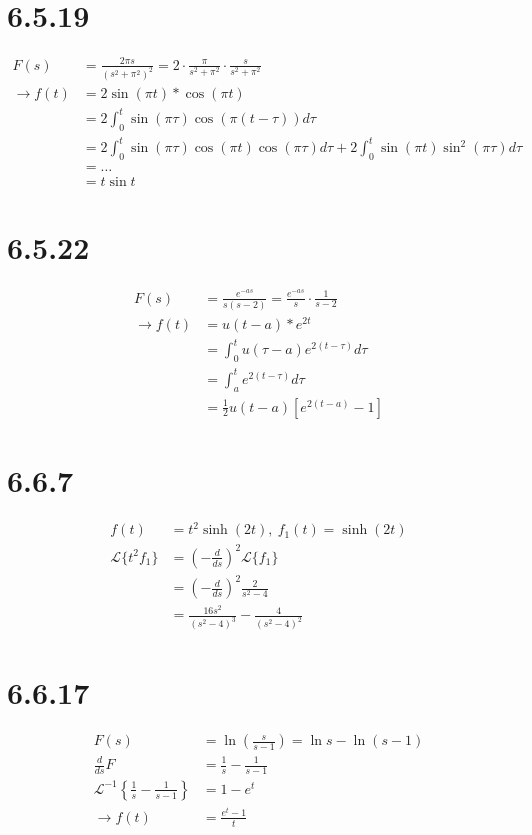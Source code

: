 \documentclass[11pt,a4paper]{article}
\newcommand{\Laplace}{\mathcal{L}}
\begin{document}
\section*{6.5.19}
\begin{align*}
    F(s) &= \frac{2\pi s}{(s^2+\pi^2)^2} = 2 \cdot \frac{\pi}{s^2+\pi^2} \cdot \frac{s}{s^2+\pi^2} \\
    \rightarrow f(t) &= 2\sin(\pi t) * \cos(\pi t) \\
    &= 2 \int_0^t \sin(\pi\tau)\cos(\pi(t-\tau))d\tau \\
    &= 2 \int_0^t \sin(\pi\tau)\cos(\pi t)\cos(\pi\tau)d\tau
        + 2 \int_0^t \sin(\pi t)\sin^2(\pi\tau)d\tau \\
    &= \dots \\
    &= t\sin t
\end{align*}

\section*{6.5.22}
\begin{align*}
    F(s) &= \frac{e^{-as}}{s(s-2)} = \frac{e^{-as}}{s} \cdot \frac{1}{s-2} \\
    \rightarrow f(t) &= u(t-a) * e^{2t} \\
    &= \int_0^t u(\tau - a)e^{2(t - \tau)}d\tau \\
    &= \int_a^t e^{2(t-\tau)}d\tau \\
    &= \frac{1}{2} u(t-a) [e^{2(t-a)} - 1]
\end{align*}

\section*{6.6.7}
\begin{align*}
    f(t) &= t^2 \sinh(2t),\ f_1(t) = \sinh(2t) \\
    \Laplace\{t^2f_1\} &= \left(- \frac{d}{ds}\right)^2 \Laplace\{f_1\} \\
    &= \left(- \frac{d}{ds}\right)^2 \frac{2}{s^2-4} \\
    &= \frac{16s^2}{(s^2-4)^3} - \frac{4}{(s^2-4)^2}
\end{align*}

\section*{6.6.17}
\begin{align*}
    F(s) &= \ln\left(\frac{s}{s-1}\right) = \ln s - \ln (s-1) \\
    \frac{d}{ds} F &= \frac{1}{s} - \frac{1}{s-1} \\
    \Laplace^{-1}\left\{\frac{1}{s} - \frac{1}{s-1}\right\} &= 1 - e^t \\
    \rightarrow f(t) &= \frac{e^t - 1}{t}
\end{align*}
\end{document}
